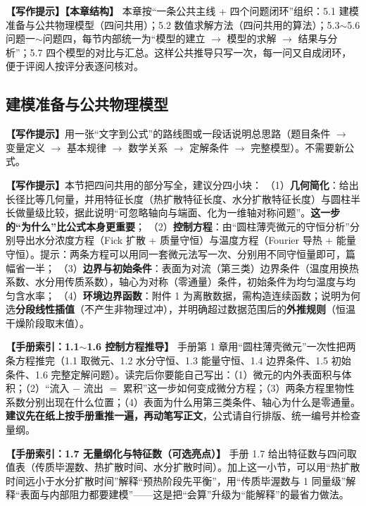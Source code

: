\documentclass[12pt,a4paper]{article}
\newcommand{\prompt}[1]{\par\noindent\textbf{【写作提示】}#1\par}      %
\newcommand{\handbook}[2]{\par\noindent\textbf{【手册索引：#1】} #2\par}
\begin{document}
\prompt{\textbf{【本章结构】} 本章按“一条公共主线 + 四个问题闭环”组织：5.1 建模准备与公共物理模型（四问共用）；5.2 数值求解方法（四问共用的算法）；5.3$\sim$5.6 问题一$\sim$问题四，每节内部统一为“模型的建立 $\rightarrow$ 模型的求解 $\rightarrow$ 结果与分析”；5.7 四个模型的对比与汇总。这样公共推导只写一次，每一问又自成闭环，便于评阅人按评分表逐问核对。}

\subsection{建模准备与公共物理模型}

\prompt{用一张“文字到公式”的路线图或一段话说明总思路（题目条件 $\rightarrow$ 变量定义 $\rightarrow$ 基本规律 $\rightarrow$ 数学关系 $\rightarrow$ 定解条件 $\rightarrow$ 完整模型）。不需要新公式。}


\prompt{本节把四问共用的部分写全，建议分四小块：
（1）\textbf{几何简化}：给出长径比等几何量，并用特征长度（热扩散特征长度、水分扩散特征长度）与圆柱半长做量级比较，据此说明“可忽略轴向与端面、化为一维轴对称问题”。\textbf{这一步的“为什么”比公式本身更重要}；
（2）\textbf{控制方程}：由“圆柱薄壳微元的守恒分析”分别导出水分浓度方程（Fick 扩散 + 质量守恒）与温度方程（Fourier 导热 + 能量守恒）。提示：两条方程可以用同一套微元法写一次、分别用不同守恒量即可，篇幅省一半；
（3）\textbf{边界与初始条件}：表面为对流（第三类）边界条件（温度用换热系数、水分用传质系数），轴心为对称（零通量）条件，初始条件为均匀温度与均匀含水率；
（4）\textbf{环境边界函数}：附件 1 为离散数据，需构造连续函数；说明为何选\textbf{分段线性插值}（不产生非物理过冲），并明确超过数据范围后的\textbf{外推规则}（恒温干燥阶段取末值）。}
\handbook{1.1$\sim$1.6 控制方程推导}{手册第 1 章用“圆柱薄壳微元”一次性把两条方程推完（1.1 取微元、1.2 水分守恒、1.3 能量守恒、1.4 边界条件、1.5 初始条件、1.6 完整定解问题）。读完后你要能自己写出：（1）微元的内外表面积与体积；（2）“流入 $-$ 流出 $=$ 累积”这一步如何变成微分方程；（3）两条方程里物性系数分别出现在什么位置；（4）表面为什么用第三类条件、轴心为什么是零通量。\textbf{建议先在纸上按手册重推一遍，再动笔写正文}，公式请自行排版、统一编号并检查量纲。}

\handbook{1.7 无量纲化与特征数（可选亮点）}{手册 1.7 给出特征数与四问取值表（传质毕渥数、热扩散时间、水分扩散时间）。加上这一小节，可以用“热扩散时间远小于水分扩散时间”解释“预热阶段先平衡”，用“传质毕渥数与 1 同量级”解释“表面与内部阻力都要建模”——这是把“会算”升级为“能解释”的最省力做法。}

\end{document}
